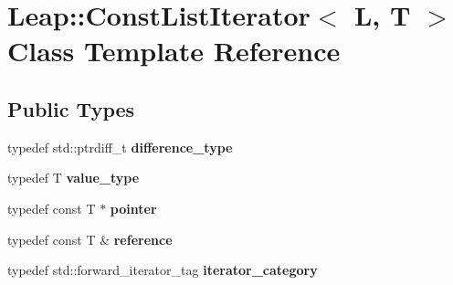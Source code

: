 \hypertarget{class_leap_1_1_const_list_iterator}{}\section{Leap\+:\+:Const\+List\+Iterator$<$ L, T $>$ Class Template Reference}
\label{class_leap_1_1_const_list_iterator}
\subsection*{Public Types}
\begin{DoxyCompactItemize}
\item 
\mbox{\label{class_leap_1_1_const_list_iterator_a98b3522472d31af5f11938113a1c6374}} 
typedef std\+::ptrdiff\+\_\+t {\bfseries difference\+\_\+type}
\item 
\mbox{\label{class_leap_1_1_const_list_iterator_adf95da5a87dd11b14108fc7cb7cd62c4}} 
typedef T {\bfseries value\+\_\+type}
\item 
\mbox{\label{class_leap_1_1_const_list_iterator_a734c2930469ac06ec6c9244a82e1f891}} 
typedef const T $\ast$ {\bfseries pointer}
\item 
\mbox{\label{class_leap_1_1_const_list_iterator_a0dc935bc99abee02e4bdd31b4824ac0d}} 
typedef const T \& {\bfseries reference}
\item 
\mbox{\label{class_leap_1_1_const_list_iterator_a86e06a3cb1723af34caf1f900db86445}} 
typedef std\+::forward\+\_\+iterator\+\_\+tag {\bfseries iterator\+\_\+category}
\end{DoxyCompactItemize}
